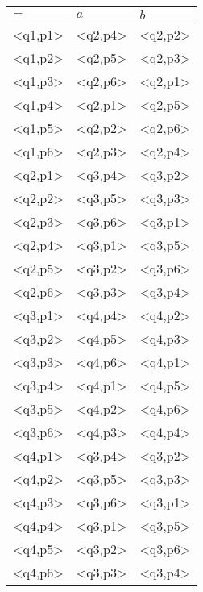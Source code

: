 \documentclass{article}
\begin{document}
\begin{enumerate}
\begin{table}[!htbp]
\begin{tabular}{|l|l|l|}

\hline

  $-$     &   $a$    &   $b$   \\ \hline
<q1,p1>   & <q2,p4>  & <q2,p2>  \\ \hline
<q1,p2>   & <q2,p5>  & <q2,p3>  \\ \hline
<q1,p3>   & <q2,p6>  & <q2,p1>  \\ \hline
<q1,p4>   & <q2,p1>  & <q2,p5>  \\ \hline
<q1,p5>   & <q2,p2>  & <q2,p6>  \\ \hline
<q1,p6>   & <q2,p3>  & <q2,p4>  \\ \hline
<q2,p1>   & <q3,p4>  & <q3,p2>  \\ \hline
<q2,p2>   & <q3,p5>  & <q3,p3>  \\ \hline
<q2,p3>   & <q3,p6>  & <q3,p1>  \\ \hline
<q2,p4>   & <q3,p1>  & <q3,p5>  \\ \hline
<q2,p5>   & <q3,p2>  & <q3,p6>  \\ \hline
<q2,p6>   & <q3,p3>  & <q3,p4>  \\ \hline
<q3,p1>   & <q4,p4>  & <q4,p2>  \\ \hline
<q3,p2>   & <q4,p5>  & <q4,p3>  \\ \hline
<q3,p3>   & <q4,p6>  & <q4,p1>  \\ \hline
<q3,p4>   & <q4,p1>  & <q4,p5>  \\ \hline
<q3,p5>   & <q4,p2>  & <q4,p6>  \\ \hline
<q3,p6>   & <q4,p3>  & <q4,p4>  \\ \hline
<q4,p1>   & <q3,p4>  & <q3,p2>  \\ \hline
<q4,p2>   & <q3,p5>  & <q3,p3>  \\ \hline
<q4,p3>   & <q3,p6>  & <q3,p1>  \\ \hline
<q4,p4>   & <q3,p1>  & <q3,p5>  \\ \hline
<q4,p5>   & <q3,p2>  & <q3,p6>  \\ \hline
<q4,p6>   & <q3,p3>  & <q3,p4>  \\ \hline

\end{tabular}

\end{table}


\end{enumerate}


\end{document}

